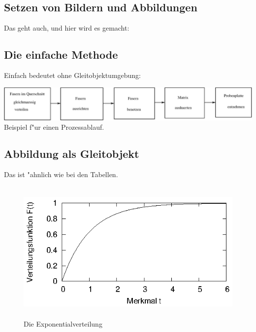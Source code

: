\subsection{Setzen von Bildern und Abbildungen}

Das geht auch, und hier wird es gemacht:

\subsection{Die einfache Methode}

Einfach bedeutet ohne Gleitobjektumgebung:

\vspace{1cm}

\hfill
\includegraphics[width=14cm]{bilder/prozess.eps}
\hfill
\mbox

\vspace{1cm}
%
Beispiel f"ur einen Prozessablauf.

\subsection{Abbildung als Gleitobjekt}

Das ist "ahnlich wie bei den Tabellen.
\begin{figure}[!htb]
\includegraphics[height=7cm]{bilder/expo1.eps}
\caption{Die Exponentialverteilung}\label{fig:expo}
\end{figure}
